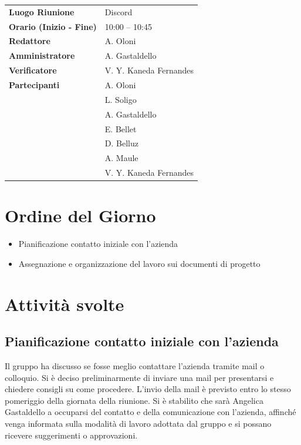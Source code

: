 \documentclass[a4paper,12pt]{article}
\begin{document}
\begin{tabular}{>{\bfseries}p{5cm} | p{10cm}}
Luogo Riunione & Discord \\[6pt]

Orario (Inizio - Fine) & 10:00 -- 10:45 \\[6pt]

Redattore &
  A. Oloni\\[6pt]

Amministratore & 
A. Gastaldello\\[6pt]

Verificatore &
V. Y. Kaneda Fernandes\\[6pt]

Partecipanti &
  A. Oloni\\ &
  L. Soligo\\&
  A. Gastaldello\\&
  E. Bellet\\&
  D. Belluz\\&
  A. Maule\\& 
  V. Y. Kaneda Fernandes\\[6pt]


\end{tabular}


\section{Ordine del Giorno}
    \begin{itemize}
    \item Pianificazione contatto iniziale con l'azienda
    \item Assegnazione e organizzazione del lavoro sui documenti di progetto
    \end{itemize}


\section{Attività svolte}
\subsection{Pianificazione contatto iniziale con l'azienda}
Il gruppo ha discusso se fosse meglio contattare l'azienda tramite mail o colloquio. 
Si è deciso preliminarmente di inviare una mail per presentarsi e chiedere consigli su come procedere. L'invio della mail è
previsto entro lo stesso pomeriggio della giornata della riunione. Si è stabilito che sarà Angelica Gastaldello a occuparsi del contatto e della comunicazione con l'azienda, 
affinché venga informata sulla modalità di lavoro adottata dal gruppo e si possano ricevere suggerimenti o approvazioni.
\end{document}
